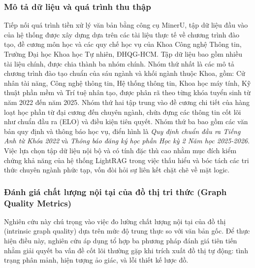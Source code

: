 \subsubsection{Mô tả dữ liệu và quá trình thu thập}
Tiếp nối quá trình tiền xử lý văn bản bằng công cụ MinerU, tập dữ liệu đầu vào của hệ thống được xây dựng dựa trên các tài liệu thực tế về chương trình đào tạo, đề cương môn học và các quy chế học vụ của Khoa Công nghệ Thông tin, Trường Đại học Khoa học Tự nhiên, ĐHQG-HCM. Tập dữ liệu bao gồm nhiều tài liệu chính, được chia thành ba nhóm chính. Nhóm thứ nhất là các mô tả chương trình đào tạo chuẩn của sáu ngành và khối ngành thuộc Khoa, gồm: Cử nhân tài năng, Công nghệ thông tin, Hệ thống thông tin, Khoa học máy tính, Kỹ thuật phần mềm và Trí tuệ nhân tạo, được phân rã theo từng khóa tuyển sinh từ năm 2022 đến năm 2025. Nhóm thứ hai tập trung vào đề cương chi tiết của hàng loạt học phần từ đại cương đến chuyên ngành, chứa đựng các thông tin cốt lõi như chuẩn đầu ra (ELO) và điều kiện tiên quyết. Nhóm thứ ba bao gồm các văn bản quy định và thông báo học vụ, điển hình là \textit{Quy định chuẩn đầu ra Tiếng Anh từ Khóa 2022} và \textit{Thông báo đăng ký học phần Học kỳ 2 Năm học 2025-2026}. Việc lựa chọn tập dữ liệu nội bộ và có tính đặc thù cao nhằm mục đích kiểm chứng khả năng của hệ thống LightRAG trong việc thấu hiểu và bóc tách các tri thức chuyên ngành phức tạp, vốn đòi hỏi sự liên kết chặt chẽ về mặt logic.
\subsubsection{Đánh giá chất lượng nội tại của đồ thị tri thức (Graph Quality Metrics)}

Nghiên cứu này chú trọng vào việc đo lường chất lượng nội tại của đồ thị (intrinsic graph quality) dựa trên mức độ trung thực so với văn bản gốc. Để thực hiện điều này, nghiên cứu áp dụng tổ hợp ba phương pháp đánh giá tiên tiến nhằm giải quyết ba vấn đề cốt lõi thường gặp khi trích xuất đồ thị tự động: tình trạng phân mảnh, hiện tượng ảo giác, và lỗi thiết kế lược đồ. 

